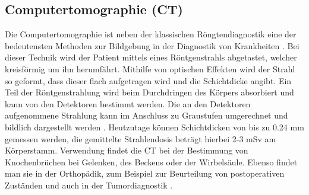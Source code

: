 \subsection{Computertomographie (CT)}
\label{sec:CT}
Die Computertomographie ist neben der klassischen Röngtendiagnostik eine der bedeutensten Methoden zur Bildgebung in der 
Diagnostik von Krankheiten \cite{Artikel3,Artikel4}. Bei dieser Technik wird der Patient mittels eines Röntgenstrahls 
abgetastet, welcher kreisförmig um ihn herumfährt. Mithilfe von optischen Effekten wird der Strahl so geformt, dass dieser flach 
aufgetragen wird und die Schichtdicke angibt. Ein Teil der Röntgenstrahlung wird beim Durchdringen des Körpers absorbiert und kann 
von den Detektoren bestimmt werden. Die an den Detektoren aufgenommene Strahlung kann im Anschluss zu Graustufen umgerechnet und 
bildlich dargestellt werden \cite{Artikel3}. 
Heutzutage können Schichtdicken von bis zu 0.24 mm gemessen werden, die gemittelte Strahlendosis beträgt hierbei 2-3 mSv am Körperstamm.
Verwendung findet die CT bei der Bestimmung von Knochenbrüchen bei Gelenken, des Beckens oder der Wirbelsäule. Ebenso findet man sie 
in der Orthopädik, zum Beispiel zur Beurteilung von postoperativen Zuständen und auch in der Tumordiagnostik \cite{Artikel4}.






